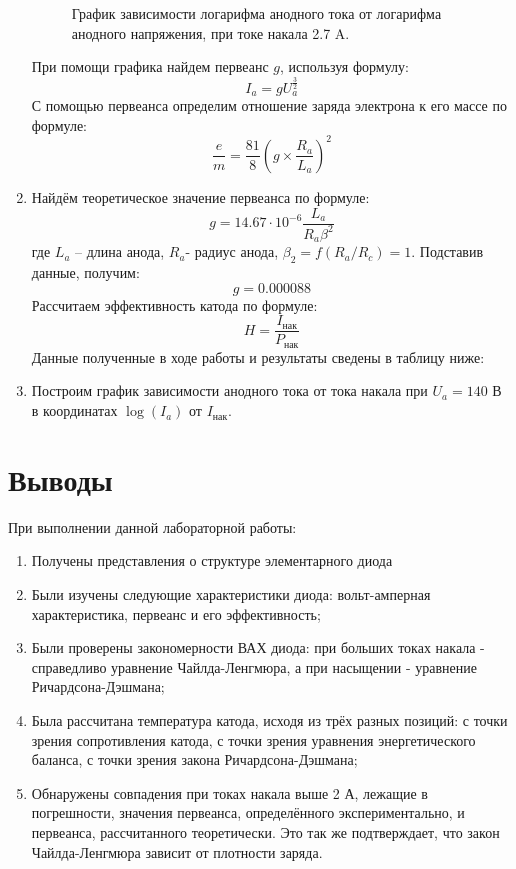 \documentclass[a4paper, 12pt]{article}
\begin{document}
\begin{enumerate}
\begin{figure}[h]
\begin{tikzpicture}
		\end{tikzpicture}
		\caption{График зависимости логарифма анодного тока от логарифма анодного напряжения, при токе накала 2.7 A.}
		\label{graph9}
	\end{figure}
	При помощи графика найдем первеанс $g$, используя формулу:
	\begin{equation}
		I_{a}=gU_a^{\frac{3}{2}}
	\end{equation}
	С помощью первеанса определим отношение заряда электрона к его массе по формуле:
	\begin{equation}
		\frac{e}{m}=\frac{81}{8}\left(g\times\frac{R_a}{L_a}\right)^2
	\end{equation}
	\item Найдём теоретическое значение первеанса по формуле:
	\begin{equation}
		g=14.67\cdot10^{-6}\frac{L_a}{R_a\beta^2}
	\end{equation}
	где $L_a$ – длина анода, $R_a$- радиус анода, $\beta_2=f(R_a/R_c) = 1$. Подставив данные, получим:
	\begin{equation*}
		g=0.000088
	\end{equation*}
	Рассчитаем эффективность катода по формуле:
	\begin{equation}
		H=\frac{I_{\text{нак}}}{P_{\text{нак}}}
	\end{equation}
	Данные полученные в ходе работы и результаты сведены в таблицу ниже:
	\item Построим график зависимости анодного тока от тока накала при $U_a=140$ В  в координатах $\log(I_a)$ от $I_{\text{нак}}$.
	\end{enumerate}
	\section{Выводы}
	При выполнении данной лабораторной работы:
	\begin{enumerate}
		\item Получены представления о структуре элементарного диода
		\item Были изучены следующие характеристики диода: вольт-амперная характеристика, первеанс и его эффективность;
		\item Были проверены закономерности ВАХ диода: при больших токах накала - справедливо уравнение Чайлда-Ленгмюра, а при насыщении - уравнение Ричардсона-Дэшмана;
		\item Была рассчитана температура катода, исходя из трёх разных позиций: с точки зрения сопротивления катода, с точки зрения уравнения энергетического баланса, с точки зрения закона Ричардсона-Дэшмана;
		\item Обнаружены совпадения при токах накала выше 2 А, лежащие в погрешности, значения первеанса, определённого экспериментально, и первеанса, рассчитанного теоретически. Это так же подтверждает, что закон Чайлда-Ленгмюра зависит от плотности заряда.
	\end{enumerate}
	
\end{document}
